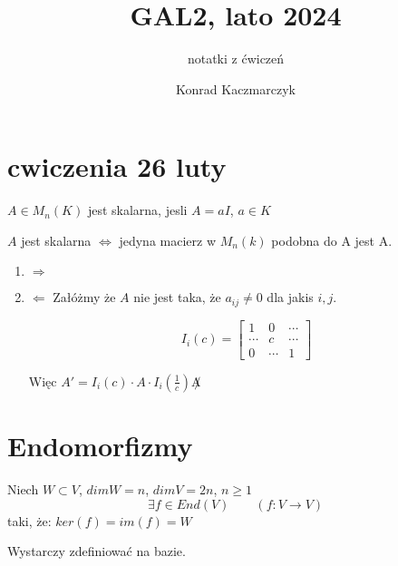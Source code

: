 \documentclass[11pt]{scrartcl}
\author{Konrad Kaczmarczyk}
\begin{document}
  \title{GAL2, lato 2024}
  \subtitle{notatki z ćwiczeń}
  \maketitle
  \section{cwiczenia 26 luty}
      \begin{definicja}
          $A \in M_n (K)$ jest skalarna, jesli $A = aI$, $a \in K$
      \end{definicja}

      \begin{fakt}
          $A$ jest skalarna $\iff $ jedyna macierz w $M_n(k)$ podobna do A jest A.
      \end{fakt}
      
      \begin{enumerate}
          \item $\Rightarrow $

          \item $\Leftarrow $
            Załóżmy że $A$ nie jest taka, że $a_{ij} \not = 0$ dla jakis $i, j$.
            \begin{uwaga}
              \[
                I_i(c) = \begin{bmatrix}
                           1 & 0 & \cdots \\
                           \cdots & c & \cdots \\
                           0 & \cdots & 1
                        \end{bmatrix}
              \]
            \end{uwaga}
            Więc $A' = I_i(c) \cdot A \cdot I_i(\frac{1}{c}) \not A$
      \end{enumerate}
  \section{Endomorfizmy}
      \begin{zadanie}
          Niech $W \subset V$, $dim W = n$, $dim V = 2n$, $n \geq 1$ \\
          \[
              \exists f \in End(V) \qquad (f: V \to V)
          \]
          taki, że: $ker (f) = im (f) = W$
           
      \end{zadanie}

      Wystarczy zdefiniować na bazie.
       
\end{document}
